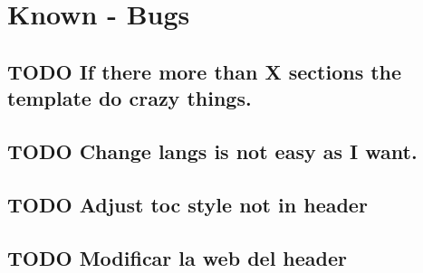 \documentclass[english]{reporti}
\begin{document}
\section{Known - Bugs}
\label{sec:orgeb1cb25}
\subsection{{\bfseries\sffamily TODO} If there more than X sections the template do crazy things.}
\label{sec:org7e3c3cf}
\subsection{{\bfseries\sffamily TODO} Change langs is not easy as I want.}
\label{sec:org8285bb0}
\subsection{{\bfseries\sffamily TODO} Adjust toc style not in header}
\label{sec:orge1e4721}
\subsection{{\bfseries\sffamily TODO} Modificar la web del header}
\label{sec:org7496b16}
\end{document}
